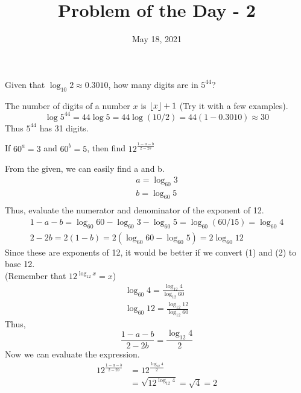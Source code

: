 \documentclass[answers]{exam}
\title{Problem of the Day - 2}
\date{May 18, 2021}
\DeclarePairedDelimiter\floor{\lfloor}{\rfloor}
\begin{document}
	\maketitle
	\begin{questions}
		\question
		Given that $\log_{10}2 \approx 0.3010$, how many digits are in $5^{44}$?
		
		\begin{solution}
			The number of digits of a number $x$ is $\floor*{x} + 1$ (Try it with a few examples).
			\begin{equation*}
			\log 5^{44} = 44 \log 5 = 44 \log (10/2) = 44(1 - 0.3010) \approx 30
			\end{equation*}
			Thus $5^{44}$ has 31 digits.
		\end{solution}
	
		\question
		If $60^a = 3$ and $60^b = 5$, then find $12^{\frac{1 - a - b}{2-2b}}$
		
		\begin{solution}
			From the given, we can easily find a and b.
			\begin{gather*}
			a = \log_{60} 3 \\
			b = \log_{60} 5 \\
			\end{gather*}
			Thus, evaluate the numerator and denominator of the exponent of 12.
			\begin{gather}
			1 - a - b = \log_{60}60 - \log_{60} 3 - \log_{60} 5 = \log_{60}(60 / 15) = \log_{60} 4 \\
			2 - 2b = 2(1 - b) = 2\left (\log_{60}60 - \log_{60}5 \right) = 2\log_{60} 12
			\end{gather}
			Since these are exponents of 12, it would be better if we convert (1) and (2) to base 12. \\
			(Remember that $12^{\log_{12}x} = x$)
			\begin{gather*}
			\log_{60} 4 = \frac{\log_{12} 4}{\log_{12} 60} \\
			\log_{60} 12 = \frac{\log_{12} 12}{\log_{12} 60}
			\end{gather*}
			Thus,
			\begin{equation*}
			\frac{1 - a - b}{2 - 2b} = \frac{\log_{12} 4}{2}
			\end{equation*}
			Now we can evaluate the expression.
			\begin{align*}
			12^{\frac{1 - a - b}{2 - 2b}} &= 12^{\frac{\log_{12} 4}{2}} \\
			&= \sqrt{12^{\log_{12} 4}} = \sqrt{4} = 2
			\end{align*}
		\end{solution} 
	\end{questions}
\end{document}
